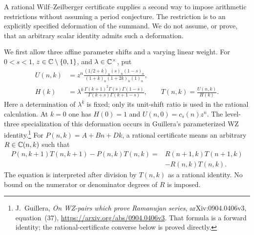 A rational Wilf--Zeilberger certificate supplies a second way to impose
arithmetic restrictions without assuming a period conjecture.  The
restriction is to an explicitly specified deformation of the summand.
We do not assume, or prove, that an arbitrary scalar identity admits
such a deformation.

We first allow three affine parameter shifts and a varying linear
weight.  For $0<s<1$, $z\in\mathbb C\setminus\{0,1\}$, and
$\lambda\in\mathbb C^\times$, put
\begin{align}
 U(n,k)&=z^n\frac{(1/2+k)_n(s)_n(1-s)_n}
 {(1+k)_n(1+2k)_n(1)_n},\label{eq:C-wz-affine-U}\\
 H(k)&=\lambda^k
 \frac{\Gamma(k+1)^2\Gamma(s)\Gamma(1-s)}
 {\Gamma(k+s)\Gamma(k+1-s)},\qquad T(n,k)=\frac{U(n,k)}{H(k)}.
 \label{eq:C-wz-affine-H}
\end{align}
Here a determination of $\lambda^k$ is fixed; only its unit-shift
ratio is used in the rational calculation.  At $k=0$ one has
$H(0)=1$ and $U(n,0)=c_s(n)z^n$.  The level-three specialization of
this deformation occurs in Guillera's parameterized WZ
identity.\footnote{J.~Guillera, \emph{On WZ-pairs which prove
Ramanujan series}, arXiv:0904.0406v3, equation~(37),
\url{https://arxiv.org/abs/0904.0406v3}.  That formula is a forward
identity; the rational-certificate converse below is proved directly.}
For $P(n,k)=A+Bn+Dk$, a rational certificate means an arbitrary
$R\in\mathbb C(n,k)$ such that
\begin{equation}\label{eq:C-wz-affine-identity}
\begin{split}
 P(n,k+1)T(n,k+1)-P(n,k)T(n,k)
 ={}&R(n+1,k)T(n+1,k)\\
 &-R(n,k)T(n,k).
\end{split}
\end{equation}
The equation is interpreted after division by $T(n,k)$ as a rational
identity.  No bound on the numerator or denominator degrees of $R$
is imposed.

